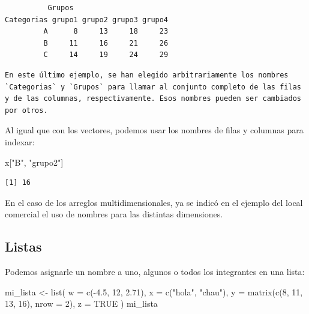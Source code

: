 \documentclass[
]{book}
\newenvironment{Shaded}{\begin{snugshade}}{\end{snugshade}}
\newcommand{\AttributeTok}[1]{\textcolor[rgb]{0.77,0.63,0.00}{#1}}
\newcommand{\ConstantTok}[1]{\textcolor[rgb]{0.00,0.00,0.00}{#1}}
\newcommand{\DecValTok}[1]{\textcolor[rgb]{0.00,0.00,0.81}{#1}}
\newcommand{\FloatTok}[1]{\textcolor[rgb]{0.00,0.00,0.81}{#1}}
\newcommand{\FunctionTok}[1]{\textcolor[rgb]{0.00,0.00,0.00}{#1}}
\newcommand{\NormalTok}[1]{#1}
\newcommand{\OtherTok}[1]{\textcolor[rgb]{0.56,0.35,0.01}{#1}}
\newcommand{\SpecialCharTok}[1]{\textcolor[rgb]{0.00,0.00,0.00}{#1}}
\newcommand{\StringTok}[1]{\textcolor[rgb]{0.31,0.60,0.02}{#1}}
\begin{document}
\begin{verbatim}
          Grupos
Categorias grupo1 grupo2 grupo3 grupo4
         A      8     13     18     23
         B     11     16     21     26
         C     14     19     24     29
\end{verbatim}

\begin{verbatim}
En este último ejemplo, se han elegido arbitrariamente los nombres `Categorias` y `Grupos` para llamar al conjunto completo de las filas y de las columnas, respectivamente. Esos nombres pueden ser cambiados por otros.
\end{verbatim}

Al igual que con los vectores, podemos usar los nombres de filas y columnas para indexar:

\begin{Shaded}
\begin{Highlighting}[]
\NormalTok{x[}\StringTok{"B"}\NormalTok{, }\StringTok{"grupo2"}\NormalTok{]}
\end{Highlighting}
\end{Shaded}

\begin{verbatim}
[1] 16
\end{verbatim}

En el caso de los arreglos multidimensionales, ya se indicó en el ejemplo del local comercial el uso de nombres para las distintas dimensiones.

\hypertarget{listas-1}{%
\subsection{Listas}\label{listas-1}}

Podemos asignarle un nombre a uno, algunos o todos los integrantes en una lista:

\begin{Shaded}
\begin{Highlighting}[]
\NormalTok{mi\_lista }\OtherTok{\textless{}{-}} \FunctionTok{list}\NormalTok{(}
    \AttributeTok{w =} \FunctionTok{c}\NormalTok{(}\SpecialCharTok{{-}}\FloatTok{4.5}\NormalTok{, }\DecValTok{12}\NormalTok{, }\FloatTok{2.71}\NormalTok{),}
    \AttributeTok{x =} \FunctionTok{c}\NormalTok{(}\StringTok{"hola"}\NormalTok{, }\StringTok{"chau"}\NormalTok{),}
    \AttributeTok{y =} \FunctionTok{matrix}\NormalTok{(}\FunctionTok{c}\NormalTok{(}\DecValTok{8}\NormalTok{, }\DecValTok{11}\NormalTok{, }\DecValTok{13}\NormalTok{, }\DecValTok{16}\NormalTok{), }\AttributeTok{nrow =} \DecValTok{2}\NormalTok{),}
    \AttributeTok{z =} \ConstantTok{TRUE}
\NormalTok{)}
\NormalTok{mi\_lista}
\end{Highlighting}
\end{Shaded}
\end{document}
